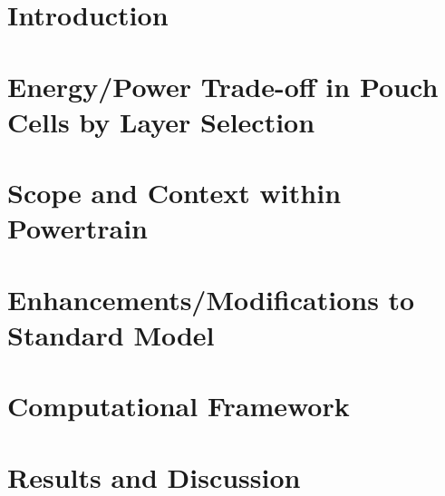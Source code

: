 

\section[Introduction]{Introduction}\label{sec:layeroptintro}


\section{Energy/Power Trade-off in Pouch Cells by Layer Selection}\label{sec:energypowertradeoff}


\section{Scope and Context within  Powertrain}


\section{Enhancements/Modifications to Standard  Model}\label{sec:numericalenhancements}


\section{Computational Framework}\label{sec:layeroptframework}


\section{Results and Discussion}\label{sec:resultslayeropt}


% 


